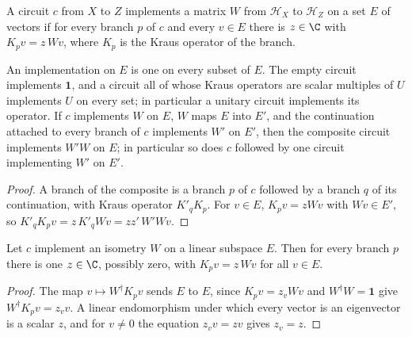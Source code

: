 \begin{definition}
    \label{def:measurement_implementation}
    \leanok
    A circuit $c$ from $X$ to $Z$ implements a matrix $W$ from $\mathcal H_X$ to $\mathcal H_Z$
    on a set $E$ of vectors if for every branch $p$ of $c$ and every $v\in E$ there is
    $z\in\C$ with $K_p v=z\,Wv$, where $K_p$ is the Kraus operator of the branch.
\end{definition}

\begin{lemma}
    \label{lem:measurement_implementation_comp}
    \leanok
    An implementation on $E$ is one on every subset of $E$. The empty circuit implements
    $\mathbf{1}$, and a circuit all of whose Kraus operators are scalar multiples of $U$ implements
    $U$ on every set; in particular a unitary circuit implements its operator. If $c$ implements
    $W$ on $E$, $W$ maps $E$ into $E'$, and the continuation attached to every branch of $c$
    implements $W'$ on $E'$, then the composite circuit implements $W'W$ on $E$; in particular
    so does $c$ followed by one circuit implementing $W'$ on $E'$.
\end{lemma}
\begin{proof}
    \leanok
    A branch of the composite is a branch $p$ of $c$ followed by a branch $q$ of its
    continuation, with Kraus operator $K'_qK_p$. For $v\in E$, $K_pv=zWv$ with $Wv\in E'$, so
    $K'_qK_pv=z\,K'_qWv=zz'\,W'Wv$.
\end{proof}

\begin{lemma}
    \label{lem:measurement_branch_scalar}
    \leanok
    Let $c$ implement an isometry $W$ on a linear subspace $E$. Then for every branch $p$ there
    is one $z\in\C$, possibly zero, with $K_pv=z\,Wv$ for all $v\in E$.
\end{lemma}
\begin{proof}
    \leanok
    The map $v\mapsto W^\dagger K_pv$ sends $E$ to $E$, since $K_pv=z_vWv$ and $W^\dagger W=\mathbf{1}$
    give $W^\dagger K_pv=z_vv$. A linear endomorphism under which every vector is an eigenvector
    is a scalar $z$, and for $v\neq0$ the equation $z_vv=zv$ gives $z_v=z$.
\end{proof}

